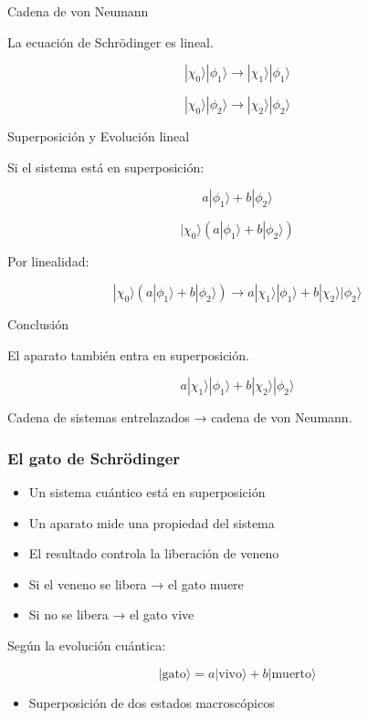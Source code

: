 \documentclass[article]{beamer}
\begin{document}
\begin{frame}{Cadena de von Neumann}

La ecuación de Schrödinger es lineal.

\[
|\chi_0\rangle |\phi_1\rangle \rightarrow |\chi_1\rangle |\phi_1\rangle
\]

\[
|\chi_0\rangle |\phi_2\rangle \rightarrow |\chi_2\rangle |\phi_2\rangle
\]

\end{frame}


\begin{frame}{Superposición y Evolución lineal}

Si el sistema está en superposición:

\[
a|\phi_1\rangle + b|\phi_2\rangle
\]

\[
|\chi_0\rangle (a|\phi_1\rangle + b|\phi_2\rangle)
\]

Por linealidad:

\[
|\chi_0\rangle (a|\phi_1\rangle + b|\phi_2\rangle)
\rightarrow
a|\chi_1\rangle|\phi_1\rangle + b|\chi_2\rangle|\phi_2\rangle
\]


\end{frame}


\begin{frame}{Conclusión}

El aparato también entra en superposición.

\[
a|\chi_1\rangle|\phi_1\rangle + b|\chi_2\rangle|\phi_2\rangle
\]

Cadena de sistemas entrelazados → cadena de von Neumann.

\end{frame}

\begin{frame}
\frametitle{El gato de Schrödinger}


\begin{itemize}
\item Un sistema cuántico está en superposición
\item Un aparato mide una propiedad del sistema
\item El resultado controla la liberación de veneno
\end{itemize}

\begin{itemize}
\item Si el veneno se libera → el gato muere
\item Si no se libera → el gato vive
\end{itemize}

Según la evolución cuántica:

\[
|\text{gato}\rangle =
a|\text{vivo}\rangle + b|\text{muerto}\rangle
\]

\begin{itemize}
\item Superposición de dos estados macroscópicos
\end{itemize}

\end{frame}
\end{document}
